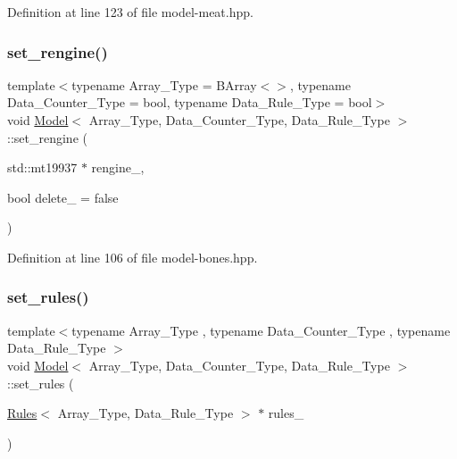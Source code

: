 Definition at line 123 of file model-\/meat.\+hpp.

\mbox{\label{class_model_a1609f530936b0f575e8b0006c9c719c5}} 
\subsubsection{\texorpdfstring{set\+\_\+rengine()}{set\_rengine()}}
{\footnotesize\ttfamily template$<$typename Array\+\_\+\+Type = B\+Array$<$$>$, typename Data\+\_\+\+Counter\+\_\+\+Type = bool, typename Data\+\_\+\+Rule\+\_\+\+Type = bool$>$ \\
void \hyperlink{class_model}{Model}$<$ Array\+\_\+\+Type, Data\+\_\+\+Counter\+\_\+\+Type, Data\+\_\+\+Rule\+\_\+\+Type $>$\+::set\+\_\+rengine (\begin{DoxyParamCaption}\item[{std\+::mt19937 $\ast$}]{rengine\+\_\+,  }\item[{bool}]{delete\+\_\+ = {\ttfamily false} }\end{DoxyParamCaption})\hspace{0.3cm}{\ttfamily [inline]}}



Definition at line 106 of file model-\/bones.\+hpp.

\mbox{\label{class_model_a86a46cf6fdc7c6514b97263f9ee4130b}} 
\subsubsection{\texorpdfstring{set\+\_\+rules()}{set\_rules()}}
{\footnotesize\ttfamily template$<$typename Array\+\_\+\+Type , typename Data\+\_\+\+Counter\+\_\+\+Type , typename Data\+\_\+\+Rule\+\_\+\+Type $>$ \\
void \hyperlink{class_model}{Model}$<$ Array\+\_\+\+Type, Data\+\_\+\+Counter\+\_\+\+Type, Data\+\_\+\+Rule\+\_\+\+Type $>$\+::set\+\_\+rules (\begin{DoxyParamCaption}\item[{\hyperlink{class_rules}{Rules}$<$ Array\+\_\+\+Type, Data\+\_\+\+Rule\+\_\+\+Type $>$ $\ast$}]{rules\+\_\+ }\end{DoxyParamCaption})\hspace{0.3cm}{\ttfamily [inline]}}



